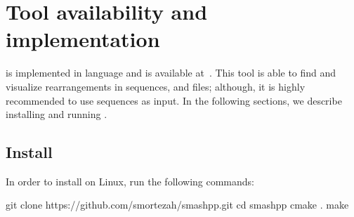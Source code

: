 \clearpage
\section{Tool availability and implementation}
\label{sec.tool}
\smashpp is implemented in \cpp language and is available at~\cite{web-smashpp}. This tool is able to find and visualize rearrangements in sequences, \fasta and \fastq files; although, it is highly recommended to use sequences as input. In the following sections, we describe installing and running \smashpp.

\subsection{Install}
In order to install \smashpp on Linux, run the following commands:
\begin{code}[style=bash]
git clone https://github.com/smortezah/smashpp.git
cd smashpp
cmake .
make
\end{code}


